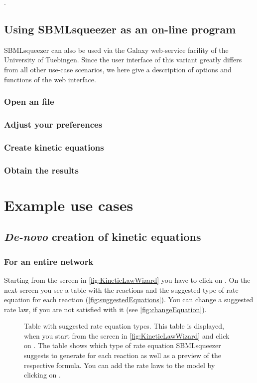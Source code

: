 .

\section{Using SBMLsqueezer as an on-line program}
\label{sec:SBMLsqueezer_online_version}

SBMLsqueezer can also be used via the Galaxy web-service facility of the University of Tuebingen.
Since the user interface of this variant greatly differs from all other use-case scenarios, we here give a description of options and functions of the web interface.

\subsection{Open an \SBML file}
\subsection{Adjust your preferences}
\subsection{Create kinetic equations}
\subsection{Obtain the results}

\chapter{Example use cases}

\section{\emph{De-novo} creation of kinetic equations}
\subsection{For an entire network}
Starting from the screen in \vref{fig:KineticLawWizard} you have to click on . On the next screen you see a table with the reactions and the suggested type of rate equation for each reaction (\vref{fig:suggestedEquations}). You can change a suggested rate law, if you are not satisfied with it (see \vref{fig:changeEquation}).

\begin{figure}[htbp]
\caption[Table with suggested rate equation types]{Table with suggested rate equation types.
This table is displayed, when you start from the screen in \vref{fig:KineticLawWizard} and click on . The table shows which type of rate equation SBMLsqueezer suggests to generate for each reaction as well as a preview of the respective formula. You can add the rate laws to the model by clicking on .}
\label{fig:suggestedEquations}
\end{figure}

